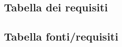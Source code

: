 \documentclass[12pt,a4paper]{article}
\begin{document}
\subsection{Tabella dei requisiti}



\subsection{Tabella fonti/requisiti}


\end{document}
